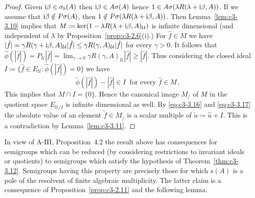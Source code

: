 \begin{proof}
	Given $\mathrm{i}\beta \in \sigma_{b}(A)$ then $\mathrm{i}\beta \in A\sigma(A)$ hence $1 \in A\sigma(\lambda R(\lambda+\mathrm{i}\beta,A))$.
	If we assume that  $\mathrm{i}\beta \notin P\sigma(A)$, then $1 \notin P\sigma(\lambda R(\lambda+\mathrm{i}\beta,A))$.
	Then Lemma~\ref{lem:c3-3.10} implies that $M \coloneqq \ker(1 - \lambda R(\lambda+\mathrm{i}\beta,A)_{\mathcal{U}})$ is infinite dimensional (and independent of $\lambda$ by Proposition~\ref{prop:c3-2.6}(i).)
	For $\hat{f} \in M$ we have $|\hat{f}| = \gamma R(\gamma+\mathrm{i}\beta,A)_{\mathcal{U}}|\hat{f}| \leq \gamma R(\gamma,A)_{\mathcal{U}}|\hat{f}|$ for every $\gamma > 0$.
	It follows that $\hat{\phi}(|\hat{f}|) = P_{\mathcal{U}}|\hat{f}| = \lim_{\gamma\to 0}\gamma R(\gamma,A)_{\mathcal{U}}|\hat{f}| \geq |\hat{f}|$.
	Thus considering the closed ideal $I \coloneqq \{\hat{f} \in E_{\mathcal{U}} \colon \hat{\phi}(|\hat{f}|) = 0\}$ we have
	\begin{equation}\label{eq:c3-3.17}
		\tilde{\phi}(|\hat{f}|) - |\hat{f}| \in I \ \text{ for every } \hat{f} \in M\,.
	\end{equation}
	This implies that $M \cap I = \{0\}$. 
	Hence the canonical image $M_/$ of $M$ in the quotient space $E_{\mathcal{U}/{I}}$ is infinite dimensional as well. 
	By \eqref{eq:c3-3.16} and \eqref{eq:c3-3.17} the absolute value of an element $\tilde{f} \in M_/$ is a scalar multiple of $\tilde{u} \coloneqq \hat{u} + I$. 
	This is a contradiction by Lemma~\ref{lem:c3-3.11}.
\end{proof}
In view of A-III, Proposition~4.2 the result above has consequences for semigroups which can be reduced (by considering restrictions to invariant ideals or quotients) to semigroups which satisfy the hypothesis of Theorem~\ref{thm:c3-3.12}. 
Semigroups having this property are precisely those for which $s(A)$ is a pole of the resolvent of finite algebraic multiplicity. 
The latter claim is a consequence of Proposition~\ref{prop:c3-2.11} and the following lemma.

